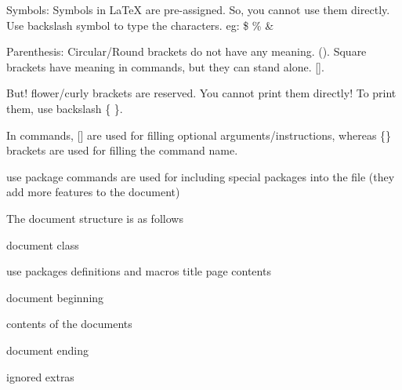 \documentclass[10pt,a4paper,twoside]{article}
\begin{document}
Symbols:
Symbols in LaTeX are pre-assigned. So, you cannot use them directly.
Use backslash symbol to type the characters.
eg: \$ \% \&

Parenthesis:
Circular/Round brackets do not have any meaning. (). Square brackets have meaning in commands, but they can stand alone. [].

But! flower/curly brackets are reserved. You cannot print them directly! {}
To print them, use backslash \{ \}.

In commands, [] are used for filling optional arguments/instructions, whereas \{\} brackets are used for filling the command name.

use package commands are used for including special packages into the file (they add more features to the document)

The document structure is as follows

document class

use packages
definitions and macros
title page contents

document beginning

contents of the documents

document ending

ignored extras
\end{document}
